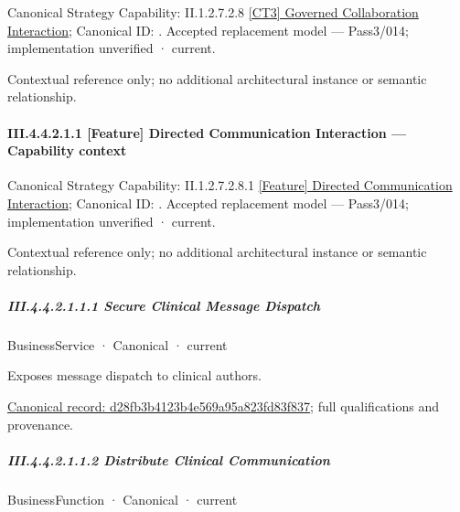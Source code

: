 {\small Canonical Strategy Capability: II.1.2.7.2.8 \hyperref[element:0f037de6d225499f9ab962a12f255d87]{[CT3] Governed Collaboration Interaction}; Canonical ID: \texttt{}. Accepted replacement model — Pass3/014; implementation unverified · current.}\par
Contextual reference only; no additional architectural instance or semantic relationship.\par
\paragraph*{III.4.4.2.1.1 [Feature] Directed Communication Interaction — Capability context}
\label{navigation:III.4.4.2.1.1}

{\small Canonical Strategy Capability: II.1.2.7.2.8.1 \hyperref[element:00b421624b6245bd9b36d35327b3ac25]{[Feature] Directed Communication Interaction}; Canonical ID: \texttt{}. Accepted replacement model — Pass3/014; implementation unverified · current.}\par
Contextual reference only; no additional architectural instance or semantic relationship.\par
\subparagraph*{III.4.4.2.1.1.1 Secure Clinical Message Dispatch}
\label{navigation:III.4.4.2.1.1.1}

\label{element:d28fb3b4123b4e569a95a823fd83f837}
{\small BusinessService · Canonical · current}\par

Exposes message dispatch to clinical authors.


{\footnotesize \href{../../../../../../../../continuum/business/business-service/d28fb3b4123b4e569a95a823fd83f837.md}{Canonical record: d28fb3b4123b4e569a95a823fd83f837}; full qualifications and provenance.}\par
\subparagraph*{III.4.4.2.1.1.2 Distribute Clinical Communication}
\label{navigation:III.4.4.2.1.1.2}

\label{element:5b8d4d4a3f7147fc9ee5f114155c2db8}
{\small BusinessFunction · Canonical · current}\par

